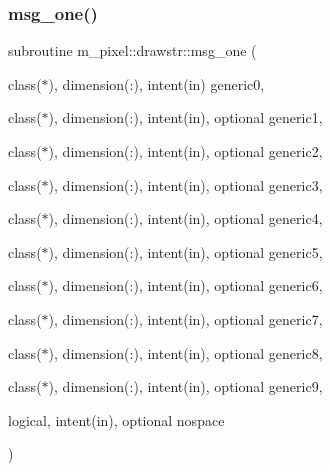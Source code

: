\subsubsection{\texorpdfstring{msg\+\_\+one()}{msg\_one()}}
{\footnotesize\ttfamily subroutine m\+\_\+pixel\+::drawstr\+::msg\+\_\+one (\begin{DoxyParamCaption}\item[{class($\ast$), dimension(\+:), intent(in)}]{generic0,  }\item[{class($\ast$), dimension(\+:), intent(in), optional}]{generic1,  }\item[{class($\ast$), dimension(\+:), intent(in), optional}]{generic2,  }\item[{class($\ast$), dimension(\+:), intent(in), optional}]{generic3,  }\item[{class($\ast$), dimension(\+:), intent(in), optional}]{generic4,  }\item[{class($\ast$), dimension(\+:), intent(in), optional}]{generic5,  }\item[{class($\ast$), dimension(\+:), intent(in), optional}]{generic6,  }\item[{class($\ast$), dimension(\+:), intent(in), optional}]{generic7,  }\item[{class($\ast$), dimension(\+:), intent(in), optional}]{generic8,  }\item[{class($\ast$), dimension(\+:), intent(in), optional}]{generic9,  }\item[{logical, intent(in), optional}]{nospace }\end{DoxyParamCaption})\hspace{0.3cm}{\ttfamily [private]}}

\mbox{\label{interfacem__pixel_1_1drawstr_a09631abb575f4e9c56f28228f97cd896}} 
